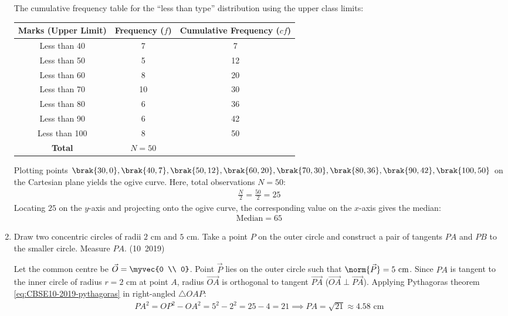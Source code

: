 \begin{enumerate}[label=\thesubsection.\arabic*, ref=\thesubsection.\theenumi]
	\solution
	The cumulative frequency table for the ``less than type'' distribution using the upper class limits:
	\begin{center}
		\begin{tabular}{|c|c|c|}
			\hline
			Marks (Upper Limit) & Frequency ($f$) & Cumulative Frequency ($cf$) \\
			\hline
			Less than 40 & 7 & 7 \\
			Less than 50 & 5 & 12 \\
			Less than 60 & 8 & 20 \\
			Less than 70 & 10 & 30 \\
			Less than 80 & 6 & 36 \\
			Less than 90 & 6 & 42 \\
			Less than 100 & 8 & 50 \\
			\hline
			\textbf{Total} & $N = 50$ & \\
			\hline
		\end{tabular}
	\end{center}
	Plotting points $\brak{30, 0}, \brak{40, 7}, \brak{50, 12}, \brak{60, 20}, \brak{70, 30}, \brak{80, 36}, \brak{90, 42}, \brak{100, 50}$ on the Cartesian plane yields the ogive curve.
	Here, total observations $N = 50$:
	\begin{align}
		\frac{N}{2} = \frac{50}{2} = 25
	\end{align}
	Locating $25$ on the $y$-axis and projecting onto the ogive curve, the corresponding value on the $x$-axis gives the median:
	\begin{align}
		\text{Median} = 65
	\end{align}

	\item Draw two concentric circles of radii $2\text{ cm}$ and $5\text{ cm}$. Take a point $P$ on the outer circle and construct a pair of tangents $PA$ and $PB$ to the smaller circle. Measure $PA$.
	\hfill (10~2019)
	
	\solution
	Let the common centre be $\vec{O} = \myvec{0 \\ 0}$. Point $\vec{P}$ lies on the outer circle such that $\norm{\vec{P}} = 5\text{ cm}$.
	Since $PA$ is tangent to the inner circle of radius $r = 2\text{ cm}$ at point $A$, radius $\vec{OA}$ is orthogonal to tangent $\vec{PA}$ ($\vec{OA} \perp \vec{PA}$).
	Applying Pythagoras theorem \eqref{eq:CBSE10-2019-pythagoras} in right-angled $\triangle OAP$:
	\begin{align}
		PA^2 = OP^2 - OA^2 = 5^2 - 2^2 = 25 - 4 = 21 \implies PA = \sqrt{21} \approx 4.58\text{ cm}
	\end{align}
	

\end{enumerate}
